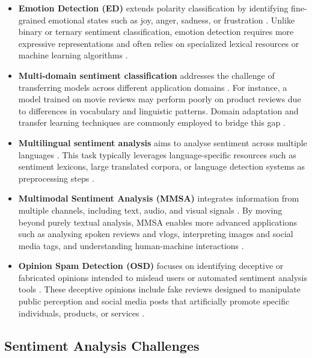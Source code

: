 \documentclass[a4paper,twoside,12pt]{book}
\begin{document}
\begin{itemize}	
	\item \textbf{Emotion Detection (ED)} extends polarity classification by identifying fine-grained emotional states such as joy, anger, sadness, or frustration \cite{sharma2025review}. Unlike binary or ternary sentiment classification, emotion detection requires more expressive representations and often relies on specialized lexical resources or machine learning algorithms \cite{sharma2025review}.
	
	\item \textbf{Multi-domain sentiment classification} addresses the challenge of transferring models across different application domains \cite{sharma2025review}. For instance, a model trained on movie reviews may perform poorly on product reviews due to differences in vocabulary and linguistic patterns. Domain adaptation and transfer learning techniques are commonly employed to bridge this gap \cite{sharma2025review}.
	
	\item \textbf{Multilingual sentiment analysis} aims to analyse sentiment across multiple languages \cite{sharma2025review}. This task typically leverages language-specific resources such as sentiment lexicons, large translated corpora, or language detection systems as preprocessing steps \cite{sharma2025review}.
	
	\item \textbf{Multimodal Sentiment Analysis (MMSA)} integrates information from multiple channels, including text, audio, and visual signals \cite{sharma2025review}. By moving beyond purely textual analysis, MMSA enables more advanced applications such as analysing spoken reviews and vlogs, interpreting images and social media tags, and understanding human-machine interactions \cite{sharma2025review}.
	
	\item \textbf{Opinion Spam Detection (OSD)} focuses on identifying deceptive or fabricated opinions intended to mislead users or automated sentiment analysis tools \cite{sharma2025review}. These deceptive opinions include fake reviews designed to manipulate public perception and social media posts that artificially promote specific individuals, products, or services \cite{sharma2025review}.
\end{itemize}

\subsection{Sentiment Analysis Challenges}
\end{document}
